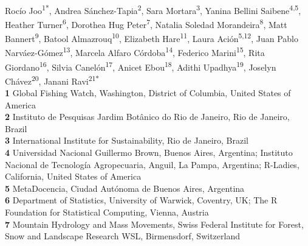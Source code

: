 \documentclass[10pt,letterpaper]{article}
\begin{document}
\vspace*{0.2in}

\begin{flushleft}
{\Large
\textbf{} %
}
\newline
\\
Rocío Joo\textsuperscript{1*\Yinyang}, 
Andrea Sánchez-Tapia\textsuperscript{2\Yinyang},
Sara Mortara\textsuperscript{3},
Yanina Bellini Saibene\textsuperscript{4,5},
Heather Turner\textsuperscript{6}, %
Dorothea Hug Peter\textsuperscript{7}, %
Natalia Soledad Morandeira\textsuperscript{8},
Matt Bannert\textsuperscript{9},
Batool Almazrouq\textsuperscript{10},
Elizabeth Hare\textsuperscript{11},
Laura Ación\textsuperscript{5,12},
Juan Pablo Narváez-Gómez\textsuperscript{13},
Marcela Alfaro Córdoba\textsuperscript{14},
Federico Marini\textsuperscript{15},
Rita Giordano\textsuperscript{16},
Silvia Canelón\textsuperscript{17},
Anicet Ebou\textsuperscript{18},
Adithi Upadhya\textsuperscript{19},
Joselyn Chávez\textsuperscript{20},
Janani Ravi\textsuperscript{21*}
\\
\bigskip
\textbf{1} Global Fishing Watch, Washington, District of Columbia, United States of America
\\
\textbf{2} Instituto de Pesquisas Jardim Botânico do Rio de Janeiro, Rio de Janeiro, Brazil
\\
\textbf{3} International Institute for Sustainability, Rio de Janeiro, Brazil
\\
\textbf{4} Universidad Nacional Guillermo Brown, Buenos Aires, Argentina; Instituto Nacional de Tecnología Agropecuaria, Anguil, La Pampa, Argentina; R-Ladies, California, United States of America  
\\
\textbf{5} MetaDocencia, Ciudad Autónoma de Buenos Aires, Argentina
\\
\textbf{6} Department of Statistics, University of Warwick, Coventry, UK; The R Foundation for Statistical Computing, Vienna, Austria
\\
\textbf{7} Mountain Hydrology and Mass Movements, Swiss Federal Institute for Forest, Snow and Landscape Research WSL, Birmensdorf, Switzerland

\end{flushleft}
\end{document}
